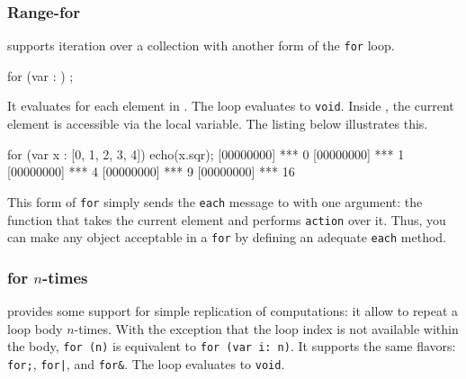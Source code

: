 \subsubsection{Range-for}
\label{sec:lang:for:each}

\us supports iteration over a collection with another form of the
\lstinline|for| loop.

\begin{urbiunchecked}[frame=, backgroundcolor=, ]
for (var  : )
   ;
\end{urbiunchecked}

It evaluates  for each element in . The loop
evaluates to \lstinline|void|.  Inside , the current element
is accessible via the  local variable. The listing below
illustrates this.

\begin{urbiscript}[firstnumber=last]
for (var x : [0, 1, 2, 3, 4])
  echo(x.sqr);
[00000000] *** 0
[00000000] *** 1
[00000000] *** 4
[00000000] *** 9
[00000000] *** 16
\end{urbiscript}

This form of \lstinline|for| simply sends the \lstinline|each| message
to  with one argument: the function that takes the
current element and performs \lstinline|action| over it. Thus, you can
make any object acceptable in a \lstinline|for| by defining an
adequate \lstinline|each| method.


\subsubsection{for $n$-times}
\label{sec:lang:for:n}

\us provides some support for simple replication of computations: it
allow to repeat a loop body $n$-times.  With the exception that the
loop index is not available within the body, \lstinline|for (n)| is
equivalent to \lstinline|for (var i: n)|.  It supports the same
flavors: \lstinline|for;|, \lstinline{for|}, and \lstinline|for&|. The
loop evaluates to \lstinline|void|.

